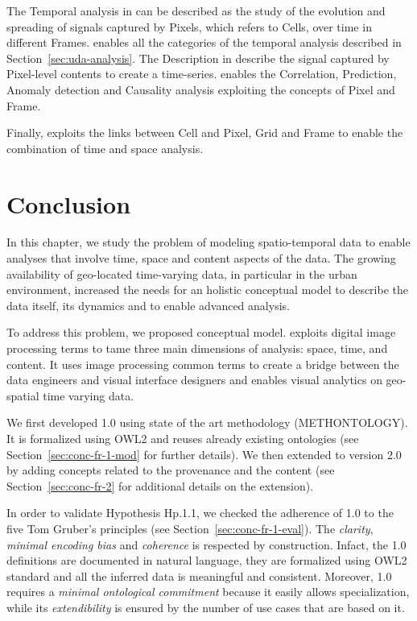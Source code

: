 The Temporal analysis in \frappe{} can be described as the study of the evolution and spreading of signals captured by \textsf{Pixel}s, which refers to \textsf{Cell}s, over time in different \textsf{Frame}s.
\frappe{} enables all the categories of the temporal analysis described in Section~\ref{sec:uda-analysis}.
The \textsf{Description} in \frappe{} describe the signal \textsf{captured} by \textsf{Pixel}-level contents to create a time-series. \frappe{} enables the \textsf{Correlation}, \textsf{Prediction}, \textsf{Anomaly detection} and \textsf{Causality} analysis exploiting the concepts of \textsf{Pixel} and \textsf{Frame}. 

Finally, \frappe{} exploits the links between \textsf{Cell} and \textsf{Pixel}, \textsf{Grid} and \textsf{Frame} to enable the combination of time and space analysis. 

\section{Conclusion}
In this chapter, we study the problem of modeling spatio-temporal data to enable analyses that involve time, space and content aspects of the data. 
The growing availability of geo-located time-varying data, in particular in the urban environment, increased the needs for an holistic conceptual model to describe the data itself, its dynamics and to enable advanced analysis.

To address this problem, we proposed \frappe{} conceptual model. 
\frappe{} exploits digital image processing terms to tame three main dimensions of analysis: space, time, and content.
It uses image processing common terms to create a bridge between the data engineers and visual interface designers and enables visual analytics on geo-spatial time varying data.

We first developed \frappe{} 1.0 using state of the art methodology (METHONTOLOGY).
It is formalized using OWL2 and reuses already existing ontologies (see Section~\ref{sec:conc-fr-1-mod} for further details).
We then extended \frappe{} to version 2.0 by adding concepts related to the provenance and the content (see Section~\ref{sec:conc-fr-2} for additional details on the extension).

In order to validate Hypothesis \textsf{Hp.1.1}, we checked the adherence of \frappe{} 1.0 to the five Tom Gruber's principles (see Section~\ref{sec:conc-fr-1-eval}).
The \textit{clarity}, \textit{minimal encoding bias} and \textit{coherence} is respected by construction. 
Infact, the \frappe{} 1.0 definitions are documented in natural language, they are formalized using OWL2 standard and all the inferred data is meaningful and consistent.  
Moreover, \frappe{} 1.0 requires a \textit{minimal ontological commitment} because it easily allows specialization, while its \textit{extendibility} is ensured by the number of use cases that are based on it.

